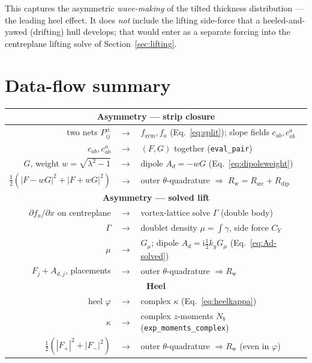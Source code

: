 \documentclass[11pt]{article}
\newcommand{\ii}{\mathrm{i}}
\newcommand{\Rw}{R_{\mathrm{w}}}
\begin{document}
This captures the asymmetric \emph{wave-making} of the tilted thickness
distribution --- the leading heel effect. It does \emph{not} include the lifting
side-force that a heeled-and-yawed (drifting) hull develops; that would enter as
a separate forcing into the centreplane lifting solve of
Section~\ref{sec:lifting}.

\section{Data-flow summary}
\label{sec:dataflow2}

\begin{center}
\begin{tabular}{r c l}
  \toprule
  \multicolumn{3}{c}{\textbf{Asymmetry --- strip closure}} \\
  \midrule
  two nets $P^\pm_{ij}$ & $\longrightarrow$ & $f_{\mathrm{sym}}, f_a$ (Eq.~\ref{eq:split}); slope fields $c_{ab}, c^a_{ab}$ \\
  $c_{ab}, c^a_{ab}$ & $\longrightarrow$ & $(F, G)$ together (\texttt{eval\_pair}) \\
  $G$, weight $w=\sqrt{\lambda^2-1}$ & $\longrightarrow$ & dipole $A_d = -wG$ (Eq.~\ref{eq:dipoleweight}) \\
  $\tfrac12(|F{-}wG|^2 + |F{+}wG|^2)$ & $\longrightarrow$ & outer $\theta$-quadrature \;$\Rightarrow\; \Rw = R_{\mathrm{src}} + R_{\mathrm{dip}}$ \\
  \midrule
  \multicolumn{3}{c}{\textbf{Asymmetry --- solved lift}} \\
  \midrule
  $\partial f_a/\partial x$ on centreplane & $\longrightarrow$ & vortex-lattice solve $\Gamma$ (double body) \\
  $\Gamma$ & $\longrightarrow$ & doublet density $\mu = \int\gamma$, side force $C_Y$ \\
  $\mu$ & $\longrightarrow$ & $G_\mu$; dipole $A_d = \ii\tfrac12 k_y G_\mu$ (Eq.~\ref{eq:Ad-solved}) \\
  $F_j + A_{d,j}$, placements & $\longrightarrow$ & outer $\theta$-quadrature $\Rightarrow \Rw$ \\
  \midrule
  \multicolumn{3}{c}{\textbf{Heel}} \\
  \midrule
  heel $\varphi$ & $\longrightarrow$ & complex $\kappa$ (Eq.~\ref{eq:heelkappa}) \\
  $\kappa$ & $\longrightarrow$ & complex $z$-moments $N_b$ (\texttt{exp\_moments\_complex}) \\
  $\tfrac12(|F_+|^2 + |F_-|^2)$ & $\longrightarrow$ & outer $\theta$-quadrature $\Rightarrow \Rw$ (even in $\varphi$) \\
  \bottomrule
\end{tabular}
\end{center}
\end{document}
